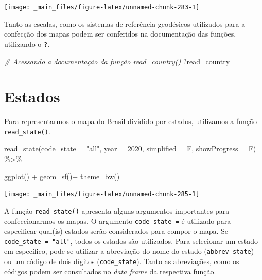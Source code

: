 \documentclass[
  brazilian,
]{book}
\newenvironment{Shaded}{\begin{snugshade}}{\end{snugshade}}
\newcommand{\AttributeTok}[1]{\textcolor[rgb]{0.77,0.63,0.00}{#1}}
\newcommand{\CommentTok}[1]{\textcolor[rgb]{0.56,0.35,0.01}{\textit{#1}}}
\newcommand{\DecValTok}[1]{\textcolor[rgb]{0.00,0.00,0.81}{#1}}
\newcommand{\FunctionTok}[1]{\textcolor[rgb]{0.00,0.00,0.00}{#1}}
\newcommand{\NormalTok}[1]{#1}
\newcommand{\SpecialCharTok}[1]{\textcolor[rgb]{0.00,0.00,0.00}{#1}}
\newcommand{\StringTok}[1]{\textcolor[rgb]{0.31,0.60,0.02}{#1}}
\begin{document}
\begin{center}\texttt{[image: \_main\_files/figure-latex/unnamed-chunk-283-1]} \end{center}

Tanto as escalas, como os sistemas de referência geodésicos utilizados para a confecção dos mapas podem ser conferidos na documentação das funções, utilizando o \texttt{?}.

\begin{Shaded}
\begin{Highlighting}[]
\CommentTok{\# Acessando a documentação da função \textasciigrave{}read\_country()\textasciigrave{} }
\NormalTok{?read\_country}
\end{Highlighting}
\end{Shaded}

\hypertarget{estados}{%
\section{Estados}\label{estados}}

Para representarmos o mapa do Brasil dividido por estados, utilizamos a função \texttt{read\_state()}.

\begin{Shaded}
\begin{Highlighting}[]
\FunctionTok{read\_state}\NormalTok{(}\AttributeTok{code\_state =} \StringTok{"all"}\NormalTok{,}
           \AttributeTok{year =} \DecValTok{2020}\NormalTok{,}
           \AttributeTok{simplified =}\NormalTok{ F,}
           \AttributeTok{showProgress =}\NormalTok{ F) }\SpecialCharTok{\%\textgreater{}\%} 
  
  \FunctionTok{ggplot}\NormalTok{() }\SpecialCharTok{+} 
  \FunctionTok{geom\_sf}\NormalTok{()}\SpecialCharTok{+}
  \FunctionTok{theme\_bw}\NormalTok{()}
\end{Highlighting}
\end{Shaded}

\begin{center}\texttt{[image: \_main\_files/figure-latex/unnamed-chunk-285-1]} \end{center}

A função \texttt{read\_state()} apresenta alguns argumentos importantes para confeccionarmos os mapas. O argumento \texttt{code\_state\ =} é utilizado para especificar qual(is) estados serão considerados para compor o mapa. Se \texttt{code\_state\ =\ "all"}, todos os estados são utilizados. Para selecionar um estado em específico, pode-se utilizar a abreviação do nome do estado (\texttt{abbrev\_state}) ou um código de dois dígitos (\texttt{code\_state}). Tanto as abreviações, como os códigos podem ser consultados no \emph{data frame} da respectiva função.
\end{document}
